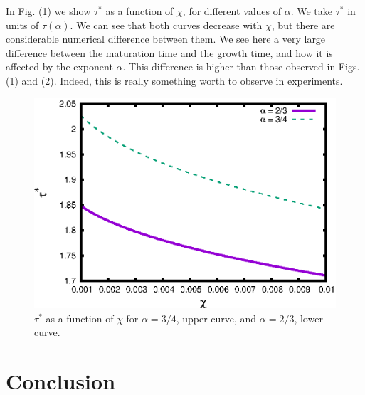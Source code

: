 In Fig. (\ref{fig:tau2}) we show $\tau^*$ as a function of $\chi$, for different values of $\alpha$. We take $\tau^*$ in units of $\tau(\alpha)$. We can see that both  curves decrease with $\chi$, but there are considerable numerical difference between them.
We see here a very large difference between the maturation time and the growth time, and how it is affected by the exponent $\alpha$.
This difference is higher than those observed in Figs. (1) and (2). Indeed, this is really something worth to observe in experiments.
\begin{figure}%
\centering
\includegraphics[width=.7\columnwidth]{tau2}%
\caption{ $\tau^*$ as a function of $\chi$ for $\alpha = 3/4$, upper curve, and $\alpha = 2/3$, lower curve.}%
\label{fig:tau2}%
\end{figure}



\section{Conclusion}


